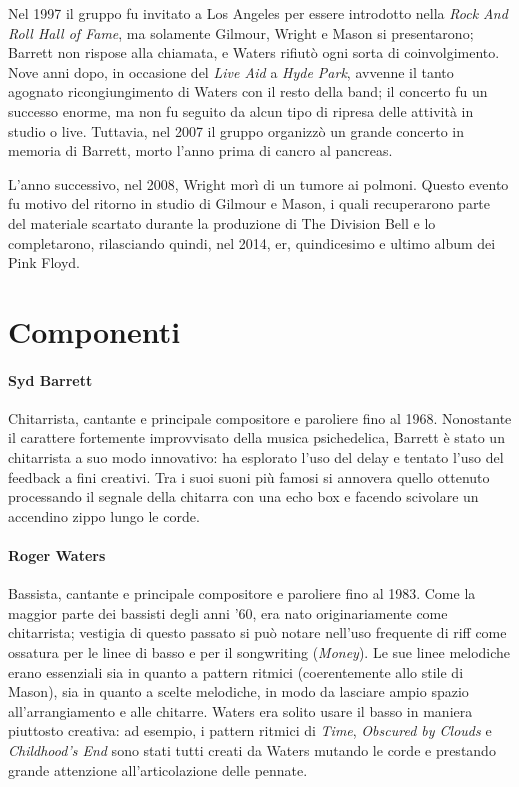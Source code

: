 \documentclass[class=book, crop=false, oneside, 12pt]{standalone}
\begin{document}
    Nel 1997 il gruppo fu invitato a Los Angeles per essere introdotto nella \emph{Rock And Roll Hall of Fame}, ma solamente Gilmour, Wright e Mason si presentarono; Barrett non rispose alla chiamata, e Waters rifiutò ogni sorta di coinvolgimento. Nove anni dopo, in occasione del \emph{Live Aid} a \emph{Hyde Park}, avvenne il tanto agognato ricongiungimento di Waters con il resto della band; il concerto fu un successo enorme, ma non fu seguito da alcun tipo di ripresa delle attività in studio o live. Tuttavia, nel 2007 il gruppo organizzò un grande concerto in memoria di Barrett, morto l'anno prima di cancro al pancreas.

    L'anno successivo, nel 2008, Wright morì di un tumore ai polmoni. Questo evento fu motivo del ritorno in studio di Gilmour e Mason, i quali recuperarono parte del materiale scartato durante la produzione di The Division Bell e lo completarono, rilasciando quindi, nel 2014, \acrfull{er}, quindicesimo e ultimo album dei Pink Floyd.

    \section{Componenti}\label{sec:01-componenti}
    \paragraph{Syd Barrett}
    Chitarrista, cantante e principale compositore e paroliere fino al 1968. Nonostante il carattere fortemente improvvisato della musica psichedelica, Barrett è stato un chitarrista a suo modo innovativo: ha esplorato l'uso del delay e tentato l'uso del feedback a fini creativi. Tra i suoi suoni più famosi si annovera quello ottenuto processando il segnale della chitarra con una echo box e facendo scivolare un accendino zippo lungo le corde. 
    \paragraph{Roger Waters}
    Bassista, cantante e principale compositore e paroliere fino al 1983. Come la maggior parte dei bassisti degli anni '60, era nato originariamente come chitarrista; vestigia di questo passato si può notare nell'uso frequente di riff come ossatura per le linee di basso e per il songwriting (\emph{Money}). Le sue linee melodiche erano essenziali sia in quanto a pattern ritmici (coerentemente allo stile di Mason), sia in quanto a scelte melodiche, in modo da lasciare ampio spazio all'arrangiamento e alle chitarre. Waters era solito usare il basso in maniera piuttosto creativa: ad esempio, i pattern ritmici di \emph{Time}, \emph{Obscured by Clouds} e \emph{Childhood's End} sono stati tutti creati da Waters mutando le corde e prestando grande attenzione all'articolazione delle pennate.
\end{document}
